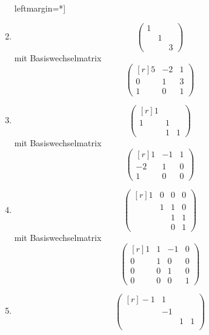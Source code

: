 \documentclass[a4paper,10pt]{scrartcl}
\begin{document}
\begin{solution}
  \begin{enumerate}leftmargin=*]
    \item
      \[
        \begin{pmatrix}
          1 &   &   \\
            & 1 &   \\
            &   & 3
        \end{pmatrix}
      \]
      mit Basiswechselmatrix
      \[
        \begin{pmatrix*}[r]
          5 & -2  & 1 \\
          0 &  1  & 3 \\
          1 &  0  & 1
        \end{pmatrix*}
      \]
    \item
      \[
        \begin{pmatrix*}[r]
          1 &   &   \\
          1 & 1 &   \\
            & 1 & 1
        \end{pmatrix*}
      \]
      mit Basiswechselmatrix
      \[
        \begin{pmatrix*}[r]
           1  & -1  & 1 \\
          -2  &  1  & 0 \\
           1  &  0  & 0
        \end{pmatrix*}
      \]
    \item
      \[
        \begin{pmatrix*}[r]
          1 & 0 & 0 & 0 \\
            & 1 & 1 & 0 \\
            &   & 1 & 1 \\
            &   & 0 & 1
        \end{pmatrix*}
      \]
      mit Basiswechselmatrix
      \[
        \begin{pmatrix*}[r]
          1 & 1 & -1 & 0  \\
          0 & 1 &  0 & 0  \\
          0 & 0 &  1 & 0  \\
          0 & 0 &  0 & 1
        \end{pmatrix*}
      \]
    \item
      \[
        \begin{pmatrix*}[r]
          -1  &  1  &   &   \\
              & -1  &   &   \\
              &     & 1 & 1 \\

\end{pmatrix*}\]
\end{enumerate}
\end{solution}
\end{document}
